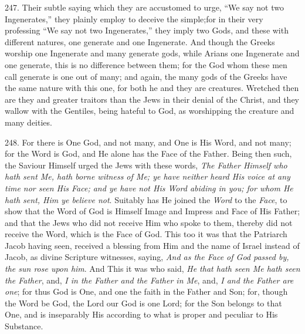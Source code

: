 247. Their
subtle saying which they are accustomed to urge, ``We say not two
Ingenerates,'' they plainly employ to deceive the simple;\emph{}for in
their very professing ``We say not two Ingenerates,'' they imply two
Gods, and these with different natures, one generate and one
Ingenerate. And though the Greeks worship one Ingenerate and many
generate gods, while Arians one Ingenerate and one generate, this is
no difference between them; for the God whom these men call generate
is one out of many; and again, the many gods of the Greeks have the
same nature with this one, for both he and they are creatures.
Wretched then are they and greater traitors than the Jews in their
denial of the Christ, and they wallow with the Gentiles, being hateful
to God, as worshipping the creature and many deities.

248. For there is One God, and not
many, and One is His Word, and not many; for the Word is God, and He
alone has the Face of the Father. Being then such, the Saviour Himself
urged the Jews with these words, \emph{The Father Himself who hath sent
Me, hath borne witness of Me; ye have neither heard His voice at any
time nor seen His Face; and ye have not His Word abiding in you; for
whom He hath sent, Him ye believe not}. Suitably has He joined the \emph{Word}
to the \emph{Face}, to show that the Word of God is Himself Image and
Impress and Face of His Father; and that the Jews who did not receive
Him who spoke to them, thereby did not receive the Word, which is the
Face of God. This too it was that the Patriarch Jacob having seen,
received a blessing from Him and the name of Israel instead of Jacob,
as divine Scripture witnesses, saying, \emph{And as the Face of God
passed by, the sun rose upon him}. And This it was who said, \emph{He
that hath seen Me hath seen the Father}, and, \emph{I in the Father
and the Father in Me}, and, \emph{I and the Father are one}; for
thus God is One, and one the faith in the Father and Son; for, though
the Word be God, the Lord our God is one Lord; for the Son belongs to
that One, and is inseparably His according to what is proper and
peculiar to His Substance.


